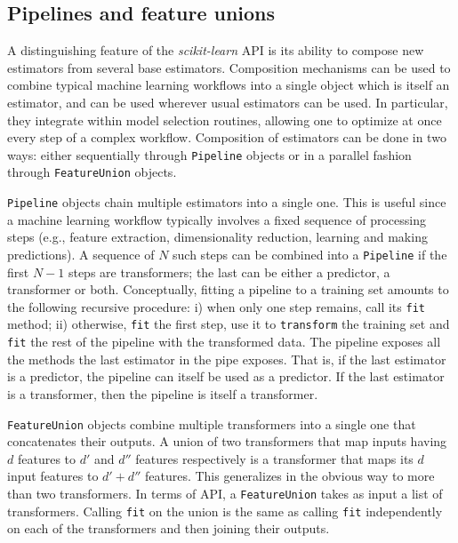 \documentclass{llncs}
\newcommand{\sklearn}{\textit{scikit-learn}\xspace}
\begin{document}

\subsection{Pipelines and feature unions}

A distinguishing feature of the \sklearn API is its ability to
compose new estimators from several base estimators. Composition mechanisms can
be used to combine typical machine learning workflows into a single object which
is itself an estimator, and can be used wherever usual estimators can be used.
In particular,
they integrate within model selection routines, allowing one to optimize at once
every step of a complex workflow. Composition of estimators can be done in two
ways: either sequentially through \texttt{Pipeline} objects or in a parallel
fashion through \texttt{FeatureUnion} objects.

\texttt{Pipeline} objects chain multiple estimators into a single one. This is
useful since a machine learning workflow typically involves a fixed sequence of
processing steps (e.g., feature extraction, dimensionality reduction, learning
and making predictions). A sequence of $N$ such steps can be combined into a
\texttt{Pipeline} if the first $N-1$ steps are transformers; the last can be
either a predictor, a transformer or both. Conceptually, fitting a pipeline to
a training set amounts to the following recursive procedure: i) when only one
step remains, call its \texttt{fit} method; ii) otherwise, \texttt{fit} the
first step, use it to \texttt{transform} the training set and \texttt{fit} the
rest of the pipeline with the transformed data. The pipeline exposes all the
methods the last estimator in the pipe exposes. That is, if the last estimator
is a predictor, the pipeline can itself be used as a predictor. If the last
estimator is a transformer, then the pipeline is itself a transformer.

\texttt{FeatureUnion} objects combine multiple transformers into a single one
that concatenates their outputs. A union of two transformers that
map inputs having $d$ features to $d'$ and $d''$ features respectively is
a transformer that maps its $d$ input features to $d' + d''$ features.
This generalizes in the obvious way to more than two transformers.
In terms of API, a \texttt{FeatureUnion} takes as input a list of transformers.
Calling \texttt{fit} on the union is the same as calling \texttt{fit}
independently on each of the transformers and then joining their outputs.
\end{document}
